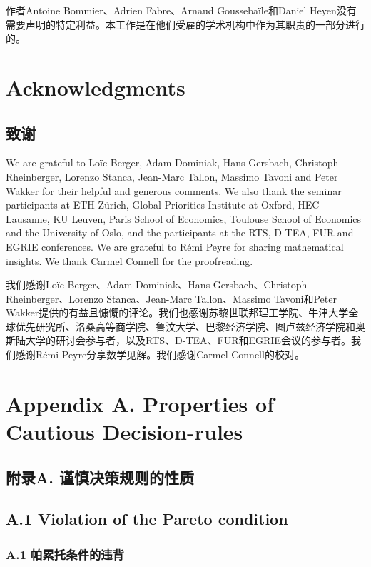 \documentclass[12pt,a4paper]{article}
\newenvironment{original}
  {\par\noindent\ignorespaces}
  {\par}
\newenvironment{translation}
  {\par\noindent{\color{transblue}\ignorespaces}}
  {\par\medskip}
\begin{document}
\begin{translation}
作者Antoine Bommier、Adrien Fabre、Arnaud Gousseba\"{i}le和Daniel Heyen没有需要声明的特定利益。本工作是在他们受雇的学术机构中作为其职责的一部分进行的。
\end{translation}

\section*{Acknowledgments}
{\color{transblue}\subsection*{致谢}}

\begin{original}
We are grateful to Lo\"{i}c Berger, Adam Dominiak, Hans Gersbach, Christoph Rheinberger, Lorenzo Stanca, Jean-Marc Tallon, Massimo Tavoni and Peter Wakker for their helpful and generous comments. We also thank the seminar participants at ETH Z\"{u}rich, Global Priorities Institute at Oxford, HEC Lausanne, KU Leuven, Paris School of Economics, Toulouse School of Economics and the University of Oslo, and the participants at the RTS, D-TEA, FUR and EGRIE conferences. We are grateful to R\'{e}mi Peyre for sharing mathematical insights. We thank Carmel Connell for the proofreading.
\end{original}

\begin{translation}
我们感谢Lo\"{i}c Berger、Adam Dominiak、Hans Gersbach、Christoph Rheinberger、Lorenzo Stanca、Jean-Marc Tallon、Massimo Tavoni和Peter Wakker提供的有益且慷慨的评论。我们也感谢苏黎世联邦理工学院、牛津大学全球优先研究所、洛桑高等商学院、鲁汶大学、巴黎经济学院、图卢兹经济学院和奥斯陆大学的研讨会参与者，以及RTS、D-TEA、FUR和EGRIE会议的参与者。我们感谢R\'{e}mi Peyre分享数学见解。我们感谢Carmel Connell的校对。
\end{translation}

\newpage
\section*{Appendix A. Properties of Cautious Decision-rules}
{\color{transblue}\subsection*{附录A. 谨慎决策规则的性质}}

\subsection*{A.1 Violation of the Pareto condition}
{\color{transblue}\subsubsection*{A.1 帕累托条件的违背}}
\end{document}
